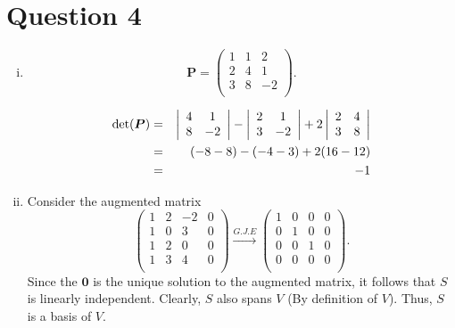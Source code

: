 \documentclass{article}
\newcommand{\bs}[1]{\boldsymbol{#1}}
\begin{document}
\newpage

\section*{Question 4}
\begin{enumerate}[(i)]
    \item 
$$\bs{P} = \left(\begin{array}{ccc}
     1 & 1 & 2 \\
     2 & 4 & 1\\
    3 & 8 & -2  \\
    \end{array}\right).$$

\begin{eqnarray}
    \text{det}(\bs{P}) &=& \left|\begin{array}{ccc}
     4 & 1 \\
    8 & -2  \\
    \end{array}\right| - \left|\begin{array}{ccc}
     2 & 1 \\
    3 & -2  \\
    \end{array}\right|+2\left|\begin{array}{ccc}
     2 & 4 \\
    3 & 8  \\
    \end{array}\right| \notag\\
    &=& (-8-8) - (-4-3) +2(16-12) \notag\\
    &=& -1 \notag
\end{eqnarray}

\item Consider the augmented matrix
$$\left(\begin{array}{ccc|c}
     1 & 2 & -2 & 0\\
     1 & 0 & 3 & 0\\
     1 & 2 & 0 & 0\\
     1 & 3 & 4 & 0 \\
    \end{array}\right) \xrightarrow[]{G.J.E} \left(\begin{array}{ccc|c}
     1 & 0 & 0 & 0\\
     0 & 1 & 0 & 0\\
     0 & 0 & 1 & 0\\
     0 & 0 & 0 & 0 \\
    \end{array}\right).$$
    Since the $\bs{0}$ is the unique solution to the augmented matrix, it follows that $S$ is linearly independent. Clearly, $S$ also spans $V$ (By definition of $V$). Thus, $S$ is a basis of $V$.


\end{enumerate}
\end{document}
